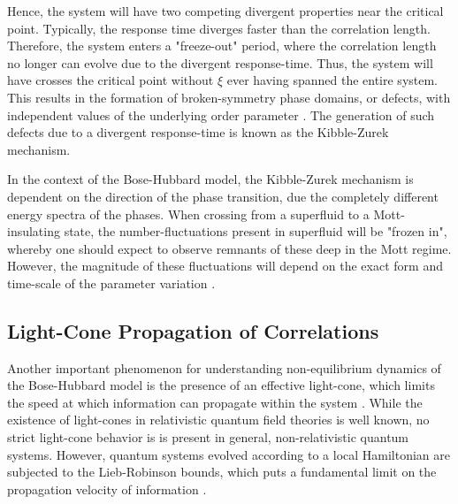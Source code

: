 Hence, the system will have two competing divergent properties near the critical point. Typically, the response time diverges faster than the correlation length. Therefore, the system enters a "freeze-out" period, where the correlation length no longer can evolve due to the divergent response-time.
Thus, the system will have crosses the critical point without $\xi$ ever having spanned the entire system. This results in the formation of broken-symmetry phase domains, or defects, with independent values of the underlying order parameter \cite{Gillman2018}. The generation of such defects due to a divergent response-time is known as the Kibble-Zurek mechanism.

In the context of the Bose-Hubbard model, the Kibble-Zurek mechanism is dependent on the direction of the phase transition, due the completely different energy spectra of the phases. When crossing from a superfluid to a Mott-insulating state, the number-fluctuations present in superfluid will be "frozen in", whereby one should expect to observe remnants of these deep in the Mott regime. However, the magnitude of these fluctuations will depend on the exact form and time-scale of the parameter variation \cite{Schutzhold2006}.


\subsection{Light-Cone Propagation of Correlations}
Another important phenomenon for understanding non-equilibrium dynamics of the Bose-Hubbard model is the presence of an effective light-cone, which limits the speed at which information can propagate within the system \cite{Eisert2015}. 
While the existence of light-cones in relativistic quantum field theories is well known, no strict light-cone behavior is is present in general, non-relativistic quantum systems. However, quantum systems evolved according to a local Hamiltonian are subjected to the Lieb-Robinson bounds, which puts a fundamental limit on the propagation velocity of information \cite{Lieb1972}.\\

